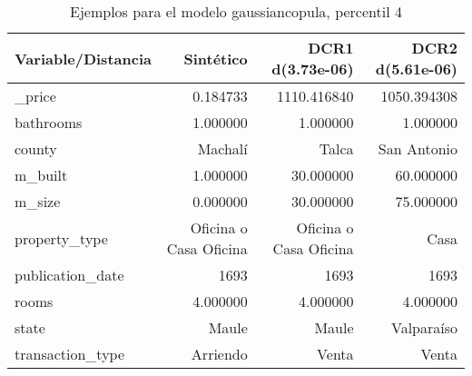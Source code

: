 \begin{table}[H]
\centering
\fontsize{10}{14}\selectfont
\caption{Ejemplos para el modelo gaussiancopula, percentil 4}
\label{table-example-economicos-a-3-gaussiancopula-4p}
\begin{tabular}{|l|r|r|r|}
\hline
\rowcolor[gray]{0.8}
Variable/Distancia & Sintético & DCR1 d(3.73e-06) & DCR2 d(5.61e-06) \\
\hline \_price & \cellcolor[rgb]{0.9, 0.54, 0.52} 0.184733 & 1110.416840 & 1050.394308 \\
\hline bathrooms & \cellcolor[rgb]{0.9, 0.54, 0.52} 1.000000 & \cellcolor[rgb]{0.9, 0.54, 0.52} 1.000000 & \cellcolor[rgb]{0.9, 0.54, 0.52} 1.000000 \\
\hline county & \cellcolor[rgb]{0.9, 0.54, 0.52} Machalí & Talca & San Antonio \\
\hline m\_built & \cellcolor[rgb]{0.9, 0.54, 0.52} 1.000000 & 30.000000 & 60.000000 \\
\hline m\_size & \cellcolor[rgb]{0.9, 0.54, 0.52} 0.000000 & 30.000000 & 75.000000 \\
\hline property\_type & \cellcolor[rgb]{0.9, 0.54, 0.52} Oficina o Casa Oficina & \cellcolor[rgb]{0.9, 0.54, 0.52} Oficina o Casa Oficina & Casa \\
\hline publication\_date & \cellcolor[rgb]{0.9, 0.54, 0.52} 1693 & \cellcolor[rgb]{0.9, 0.54, 0.52} 1693 & \cellcolor[rgb]{0.9, 0.54, 0.52} 1693 \\
\hline rooms & \cellcolor[rgb]{0.9, 0.54, 0.52} 4.000000 & \cellcolor[rgb]{0.9, 0.54, 0.52} 4.000000 & \cellcolor[rgb]{0.9, 0.54, 0.52} 4.000000 \\
\hline state & \cellcolor[rgb]{0.9, 0.54, 0.52} Maule & \cellcolor[rgb]{0.9, 0.54, 0.52} Maule & Valparaíso \\
\hline transaction\_type & \cellcolor[rgb]{0.9, 0.54, 0.52} Arriendo & Venta & Venta \\
\hline
\end{tabular}
\end{table}
